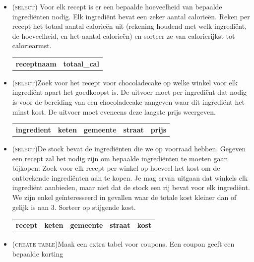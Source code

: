 \documentclass[a4paper]{article}
\begin{document}
\begin{itemize}
  \item (\textsc{select}) Voor elk recept is er een bepaalde hoeveelheid van bepaalde ingredi\"enten nodig.
        Elk ingredi\"ent bevat een zeker aantal calorie\"en.
        Reken per recept het totaal aantal calorie\"en uit (rekening houdend
        met welk ingredi\"ent, de hoeveelheid, en het aantal calorie\"en) en
        sorteer ze van calorierijkst tot caloriearmst.
        \begin{center}
          \begin{tabular}{c|c}
            {\bf receptnaam} & {\bf totaal\_cal}
          \end{tabular}
        \end{center}
  \item (\textsc{select})Zoek voor het recept voor chocoladecake
        op welke winkel voor elk ingredi\"ent apart het goedkoopst is.
        De uitvoer moet per ingredi\"ent dat nodig is voor
        de bereiding van een chocoladecake aangeven waar dit
        ingredi\"ent het minst kost. De uitvoer moet eveneens deze laagste prijs weergeven.
        \begin{center}
          \begin{tabular}{c|c|c|c|c}
            {\bf ingredient} & {\bf keten} & {\bf gemeente} & {\bf straat} & {\bf prijs}
          \end{tabular}
        \end{center}
  \item (\textsc{select})De stock bevat de ingredi\"enten die we op voorraad hebben.
        Gegeven een recept zal het nodig zijn om bepaalde ingredi\"enten
        te moeten gaan bijkopen. Zoek voor elk recept per winkel op hoeveel
        het kost om de ontbrekende ingredi\"enten aan te kopen.
        Je mag ervan uitgaan dat winkels elk ingredi\"ent aanbieden,
        maar niet dat de stock een rij bevat voor elk ingredi\"ent.
        We zijn enkel ge\"interesseerd in gevallen waar de totale
        kost kleiner dan of gelijk is aan 3. Sorteer op stijgende kost.
        \begin{center}
          \begin{tabular}{c|c|c|c|c}
            {\bf recept} & {\bf keten} & {\bf gemeente} & {\bf straat} & {\bf kost}
          \end{tabular}
        \end{center}
  \item (\textsc{create table})Maak een extra tabel voor coupons. Een coupon geeft een bepaalde korting

\end{itemize}
\end{document}
